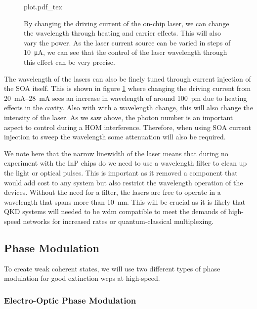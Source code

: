 \begin{figure}[tp]
	\centering
	\small	
	\def\svgwidth{\textwidth} 
	{plot.pdf_tex}
	\caption[Laser wavelength current-injection sweep]{By changing the driving current of the on-chip laser, we can change the wavelength through heating and carrier effects. This will also vary the power. As the laser current source can be varied in steps of \SI{10}{\uA}, we can see that the control of the laser wavelength through this effect can be very precise.}
	\label{fig:curr_sweep}
\end{figure}

The wavelength of the lasers can also be finely tuned through current injection of the \ac{SOA} itself. This is shown in figure \ref{fig:curr_sweep} where changing the driving current from \SIrange{20}{28}{mA} sees an increase in wavelength of around \SI{100}{pm} due to heating effects in the cavity. Also with with a wavelength change, this will also change the intensity of the laser. As we saw above, the photon number is an important aspect to control during a \ac{HOM} interference. Therefore, when using \ac{SOA} current injection to sweep the wavelength some attenuation will also be required. 

We note here that the narrow linewidth of the laser means that during no experiment with the \ac{InP} chips do we need to use a wavelength filter to clean up the light or optical pulses. This is important as it removed a component that would add cost to any system but also restrict the wavelength operation of the devices. Without the need for a filter, the lasers are free to operate in a wavelength that spans more than \SI{10}{nm}. This will be crucial as it is likely that \ac{QKD} systems will needed to be \ac{wdm} compatible to meet the demands of high-speed networks for increased rates or quantum-classical multiplexing.

\subsection{Phase Modulation}

To create weak coherent states, we will use two different types of phase modulation for good extinction \acp{wcp} at high-speed. 

\subsubsection{Electro-Optic Phase Modulation}


